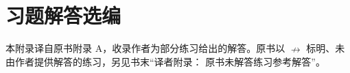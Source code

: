 
\chapter{习题解答选编}
\label{app:solutions}

本附录译自原书附录 A，收录作者为部分练习给出的解答。原书以
\(\nrightarrow\) 标明、未由作者提供解答的练习，另见书末“译者附录：
原书未解答练习参考解答”。

























